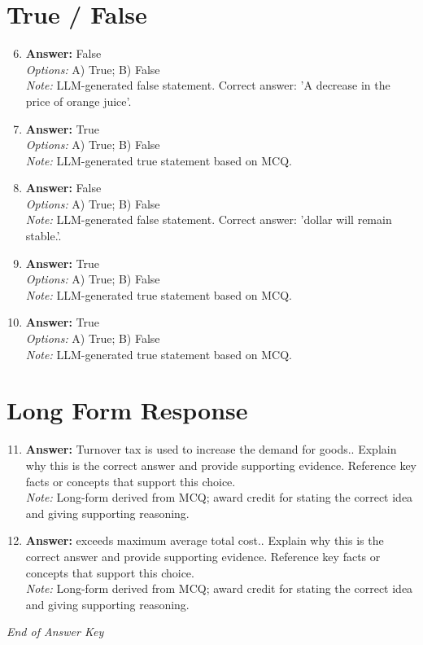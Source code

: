 \documentclass[12pt]{article}
\begin{document}
\section*{True / False}
\begin{enumerate}[label=\arabic*.]
\setcounter{enumi}{5}
\item \textbf{Answer:} False
\\ \textit{Options:} A) True; B) False
\\ \textit{Note:} LLM-generated false statement. Correct answer: 'A decrease in the price of orange juice'.
\item \textbf{Answer:} True
\\ \textit{Options:} A) True; B) False
\\ \textit{Note:} LLM-generated true statement based on MCQ.
\item \textbf{Answer:} False
\\ \textit{Options:} A) True; B) False
\\ \textit{Note:} LLM-generated false statement. Correct answer: 'dollar will remain stable.'.
\item \textbf{Answer:} True
\\ \textit{Options:} A) True; B) False
\\ \textit{Note:} LLM-generated true statement based on MCQ.
\item \textbf{Answer:} True
\\ \textit{Options:} A) True; B) False
\\ \textit{Note:} LLM-generated true statement based on MCQ.
\end{enumerate}

\section*{Long Form Response}
\begin{enumerate}[label=\arabic*.]
\setcounter{enumi}{10}
\item \textbf{Answer:} Turnover tax is used to increase the demand for goods.. Explain why this is the correct answer and provide supporting evidence. Reference key facts or concepts that support this choice.
\\ \textit{Note:} Long-form derived from MCQ; award credit for stating the correct idea and giving supporting reasoning.
\item \textbf{Answer:} exceeds maximum average total cost.. Explain why this is the correct answer and provide supporting evidence. Reference key facts or concepts that support this choice.
\\ \textit{Note:} Long-form derived from MCQ; award credit for stating the correct idea and giving supporting reasoning.
\end{enumerate}

\vfill
\noindent\textit{End of Answer Key}
\end{document}
